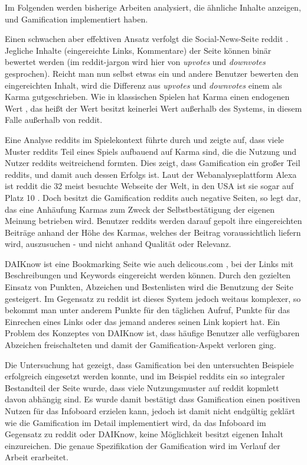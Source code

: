 \documentclass[12pt,twoside]{book}
\begin{document}
Im Folgenden werden bisherige Arbeiten analysiert, die ähnliche Inhalte anzeigen, und Gamification implementiert haben.

Einen schwachen aber effektiven Ansatz verfolgt die Social-News-Seite reddit \cite{reddit}. Jegliche Inhalte (eingereichte Links, Kommentare) der Seite können binär bewertet werden (im reddit-jargon wird hier von \textit{upvotes} und \textit{downvotes} gesprochen). Reicht man nun selbst etwas ein und andere Benutzer bewerten den eingereichten Inhalt, wird die Differenz aus \textit{upvotes} und \textit{downvotes} einem als Karma gutgeschrieben. Wie in klassischen Spielen hat Karma einen endogenen Wert \citep{costikyan2005have, 21 - 22}, das heißt der Wert besitzt keinerlei Wert außerhalb des Systems, in diesem Falle außerhalb von reddit.

Eine Analyse reddits im Spielekontext führte \cite{massanari2013playful} durch und zeigte auf, dass viele Muster reddits Teil eines Spiels aufbauend auf Karma sind, die die Nutzung und Nutzer reddits weitreichend formten.
Dies zeigt, dass Gamification ein großer Teil reddits, und damit auch dessen Erfolgs ist. Laut der Webanalyseplattform Alexa ist reddit die 32 meist besuchte Webseite der Welt, in den USA ist sie sogar auf Platz 10 \cite{alexa}.
Doch besitzt die Gamification reddits auch negative Seiten, so legt \citep{richerichkarma}  dar, das eine Anhäufung Karmas zum Zweck der Selbstbestätigung der eigenen Meinung betrieben wird. Benutzer reddits werden darauf gepolt ihre eingereichten Beiträge anhand der Höhe des Karmas, welches der Beitrag voraussichtlich liefern wird, auszusuchen - und nicht anhand Qualität oder Relevanz.

DAIKnow \citep{meder2014daiknow} ist eine Bookmarking Seite wie auch delicous.com \cite{delicious}, bei der Links mit Beschreibungen und Keywords eingereicht werden können. Durch den gezielten Einsatz von Punkten, Abzeichen und Bestenlisten wird die Benutzung der Seite gesteigert. Im Gegensatz zu reddit ist dieses System jedoch weitaus komplexer, so bekommt man unter anderem Punkte für den täglichen Aufruf, Punkte für das Einrechen eines Links oder das jemand anderes seinen Link kopiert hat.
Ein Problem des Konzeptes von DAIKnow ist, dass häufige Benutzer alle verfügbaren Abzeichen freischalteten und damit der Gamification-Aspekt verloren ging.

Die Untersuchung hat gezeigt, dass Gamification bei den untersuchten Beispiele erfolgreich eingesetzt werden konnte, und im Beispiel reddits ein so integraler Bestandteil der Seite wurde, dass viele Nutzungsmuster auf reddit kopmlett davon abhängig sind. Es wurde damit bestätigt dass Gamification einen positiven Nutzen für das Infoboard erzielen kann, jedoch ist damit nicht endgültig geklärt wie die Gamification im Detail implementiert wird, da das Infoboard im Gegensatz zu reddit oder DAIKnow, keine Möglichkeit besitzt eigenen Inhalt einzureichen. Die genaue Spezifikation der Gamification wird im Verlauf der Arbeit erarbeitet.
\end{document}
